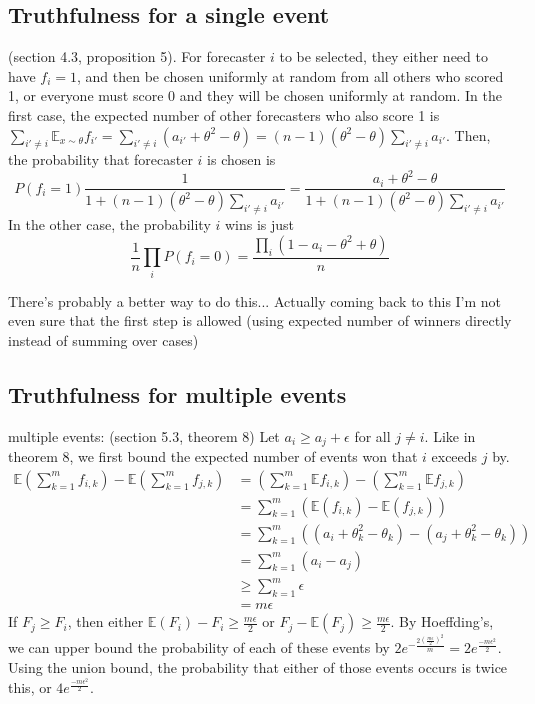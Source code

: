 \documentclass[letterpaper,12pt]{article}
\newcommand{\E}{\mathbb{E}}
\newcommand{\1}{\mathbbm{1}}
\begin{document}
\subsection{Truthfulness for a single event}
(section 4.3, proposition 5).  For forecaster $i$ to be selected, they either need to have $f_i = 1$, and then be chosen uniformly at random from all others who scored 1, or everyone must score 0 and they will be chosen uniformly at random. In the first case, the expected number of other forecasters who also score 1 is $\sum_{i' \neq i} \E_{x \sim \theta} f_{i'} = \sum_{i' \neq i} (a_{i'} + \theta^2 - \theta) = (n-1) (\theta^2 - \theta) \sum_{i' \neq i} a_{i'}$. Then, the probability that forecaster $i$ is chosen is 
\[
  P(f_i = 1) \frac{1}{1 + (n-1) (\theta^2 - \theta) \sum_{i' \neq i} a_{i'}} = \frac{a_i +\theta^2 - \theta}{1 + (n-1) (\theta^2 - \theta) \sum_{i' \neq i} a_{i'}}
\]
In the other case, the probability $i$ wins is just 
\[
  \frac{1}{n} \prod_{i} P(f_i = 0) = \frac{\prod_i (1 - a_i -\theta^2 + \theta)}{n}
\]

There's probably a better way to do this... Actually coming back to this I'm not even sure that the first step is allowed (using expected number of winners directly instead of summing over cases)

\subsection{Truthfulness for multiple events}
multiple events: (section 5.3, theorem 8)
Let $a_i \geq a_j + \epsilon$ for all $j\neq i$. Like in theorem 8, we first bound the expected number of events won that $i$ exceeds $j$ by. 
\begin{align*}
  \E \left( \sum_{k=1}^m f_{i, k}\right) - \E \left( \sum_{k=1}^m f_{j, k}\right)
  &= \left( \sum_{k=1}^m \E f_{i, k}\right) - \left( \sum_{k=1}^m \E f_{j, k}\right)\\
  &= \sum_{k=1}^m \left(\E (f_{i, k}) - \E (f_{j, k})\right)\\
  &= \sum_{k=1}^m \left((a_i + \theta_k^2 - \theta_k) - (a_j + \theta_k^2 - \theta_k)\right)\\
  &= \sum_{k=1}^m \left(a_i - a_j\right)\\
  &\geq \sum_{k=1}^m \epsilon\\
  &=m \epsilon
\end{align*}
If $F_j \geq F_i$, then either $\E(F_i) - F_i \geq \frac{m \epsilon}{2}$ or $F_j - \E(F_j) \geq \frac{m \epsilon}{2}$. By Hoeffding's, we can upper bound the probability of each of these events by $2 e^{-\frac{2 (\frac{m \epsilon}{2})^2}{m}} = 2 e^{\frac{- m \epsilon^2}{2}}$. Using the union bound, the probability that either of those events occurs is twice this, or $4 e^{\frac{- m \epsilon^2}{2}}$.
\end{document}
